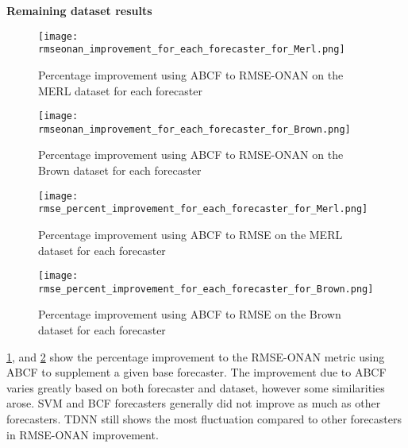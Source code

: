 \bigskip
\noindent \textbf{Remaining dataset results} 

\begin{figure}[p]
	\begin{center}
		\texttt{[image: rmseonan\_improvement\_for\_each\_forecaster\_for\_Merl.png]}
	\end{center}
	\caption{Percentage improvement using ABCF to RMSE-ONAN on the MERL dataset for each forecaster}
	\label{fig:rmseonan_improve_merl}
\end{figure}

\begin{figure}[p]
	\begin{center}
		\texttt{[image: rmseonan\_improvement\_for\_each\_forecaster\_for\_Brown.png]}
	\end{center}
	\caption{Percentage improvement using ABCF to RMSE-ONAN on the Brown dataset for each forecaster}
	\label{fig:rmseonan_improve_brown}
\end{figure}

\begin{figure}[p]
	\begin{center}
		\texttt{[image: rmse\_percent\_improvement\_for\_each\_forecaster\_for\_Merl.png]}
	\end{center}
	\caption{Percentage improvement using ABCF to RMSE on the MERL dataset for each forecaster}
	\label{fig:rmse_improve_merl}
\end{figure}

\begin{figure}[p]
	\begin{center}
		\texttt{[image: rmse\_percent\_improvement\_for\_each\_forecaster\_for\_Brown.png]}
	\end{center}
	\caption{Percentage improvement using ABCF to RMSE on the Brown dataset for each forecaster}
	\label{fig:rmse_improve_brown}
\end{figure}

\ref{fig:rmseonan_improve_merl}, and \ref{fig:rmseonan_improve_brown} show the percentage improvement to the RMSE-ONAN metric using ABCF to supplement a given base forecaster.  The improvement due to ABCF varies greatly based on both forecaster and dataset, however some similarities arose.  SVM and BCF forecasters generally did not improve as much as other forecasters.  TDNN still shows the most fluctuation compared to other forecasters in RMSE-ONAN improvement.

